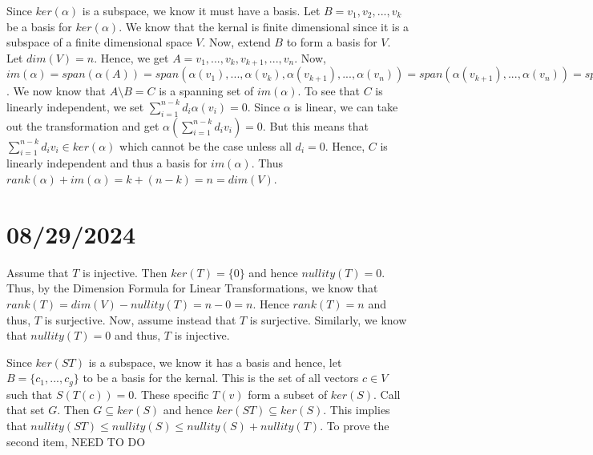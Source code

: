 \documentclass{report}
\begin{document}
\begin{myproof}
    Since $ker(\alpha)$ is a subspace, we know it must have a basis. Let $B = {v_1, v_2, ..., v_k}$ be a basis for $ker(\alpha)$. We know that the kernal is finite dimensional since it is a subspace of a finite dimensional space $V$. Now, extend $B$ to form a basis for $V$. Let $dim(V) = n$. Hence, we get $A = {v_1, ..., v_k, v_{k+1}, ..., v_n}$. Now, $im(\alpha) = span(\alpha(A)) = span(\alpha(v_1), ..., \alpha(v_k), \alpha(v_{k+1}), ..., \alpha(v_n)) = span(\alpha(v_{k+1}), ..., \alpha(v_n)) = span(A \setminus B)$. We now know that $A\setminus B = C$ is a spanning set of $im(\alpha)$. To see that $C$ is linearly independent, we set $\sum_{i=1}^{n-k} d_i\alpha(v_i) = 0$. Since $\alpha$ is linear, we can take out the transformation and get $\alpha(\sum_{i=1}^{n-k} d_iv_i) = 0$. But this means that $\sum_{i=1}^{n-k} d_iv_i \in ker(\alpha)$ which cannot be the case unless all $d_i = 0$. Hence, $C$ is linearly independent and thus a basis for $im(\alpha)$. Thus $rank(\alpha) + im(\alpha) = k + (n-k) = n = dim(V)$.
\end{myproof}

\section{08/29/2024}


\begin{myproof}
    Assume that $T$ is injective. Then $ker(T) = \{0\}$ and hence $nullity(T) = 0$. Thus, by the Dimension Formula for Linear Transformations, we know that $rank(T) = dim(V) - nullity(T) = n-0=n$. Hence $rank(T) = n$ and thus, $T$ is surjective. Now, assume instead that $T$ is surjective. Similarly, we know that $nullity(T) = 0$ and thus, $T$ is injective. 
\end{myproof}


\begin{myproof}
    Since $ker(ST)$ is a subspace, we know it has a basis and hence, let $B = \{c_1, ..., c_g\}$ to be a basis for the kernal. This is the set of all vectors $c\in V$ such that $S(T(c)) = 0$. These specific $T(v)$ form a subset of $ker(S)$. Call that set $G$. Then $G \subseteq ker(S)$ and hence $ker(ST) \subseteq ker(S)$. This implies that $nullity(ST) \leq nullity(S) \leq nullity(S) + nullity(T)$.
    \newline
    To prove the second item, NEED TO DO
\end{myproof}

\end{document}
